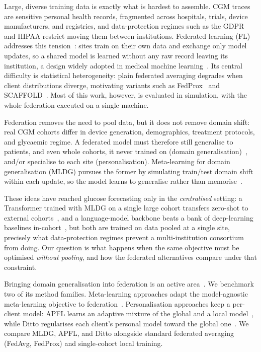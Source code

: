 \documentclass[10pt,letterpaper]{article}
\begin{document}
Large, diverse training data is exactly what is hardest to assemble. CGM
traces are sensitive personal health records, fragmented across hospitals,
trials, device manufacturers, and registries, and data-protection regimes
such as the GDPR and HIPAA restrict moving them between institutions.
Federated learning (FL) addresses this tension~\cite{mcmahan2017fedavg}:
sites train on their own data and exchange only model updates, so a shared
model is learned without any raw record leaving its institution, a
design widely adopted in medical machine
learning~\cite{rieke2020future,sheller2020federated,kaissis2020secure}. Its
central difficulty is statistical heterogeneity: plain federated averaging
degrades when client distributions diverge, motivating variants such as
FedProx~\cite{li2020fedprox} and SCAFFOLD~\cite{karimireddy2020scaffold}.
Most of this work, however, is evaluated in simulation, with the whole
federation executed on a single machine.

Federation removes the need to pool data, but it does not remove domain
shift: real CGM cohorts differ in device generation, demographics,
treatment protocols, and glycaemic regime. A federated model must therefore
still generalise to patients, and even whole cohorts, it never trained on
(domain generalisation)~\cite{zhou2022dgsurvey}, and/or specialise to each
site (personalisation). Meta-learning for domain generalisation (MLDG)
pursues the former by simulating train/test domain shift within each
update, so the model learns to generalise rather than
memorise~\cite{li2018mldg}.

These ideas have reached glucose forecasting only in the \emph{centralised}
setting: a Transformer trained with MLDG on a single large cohort transfers
zero-shot to external cohorts~\cite{zhu2024gpformer}, and a language-model
backbone beats a bank of deep-learning baselines in-cohort~\cite{zhu2026glullm}, but both
are trained on data pooled at a single site, precisely what
data-protection regimes prevent a multi-institution consortium from doing.
Our question is what happens when the same objective must be optimised
\emph{without pooling}, and how the federated alternatives compare under
that constraint.

Bringing domain generalisation into federation is an active
area~\cite{li2025fedDGsurvey}. We benchmark two of its method families.
Meta-learning approaches adapt the model-agnostic meta-learning objective
to federation~\cite{chen2018fedmeta,fallah2020perfedavg}. Personalisation
approaches keep a per-client model: APFL learns an adaptive mixture of the
global and a local model~\cite{deng2020apfl}, while Ditto regularises each
client's personal model toward the global one~\cite{li2021ditto}. We
compare MLDG, APFL, and Ditto alongside standard federated averaging
(FedAvg, FedProx) and single-cohort local training.
\end{document}

